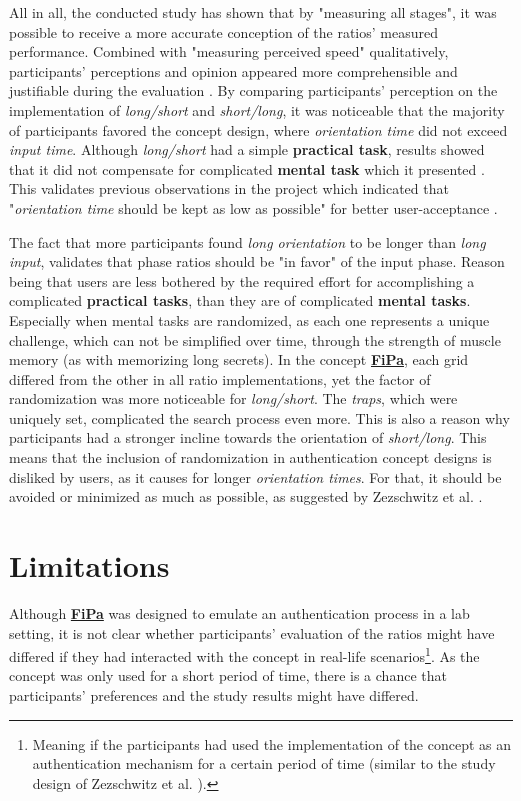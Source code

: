 All in all, the conducted study has shown that by "measuring all stages", it was possible to receive a more accurate conception of the ratios' measured performance. Combined with "measuring perceived speed" qualitatively, participants' perceptions and opinion appeared more comprehensible and justifiable during the evaluation \cite{Zezschwitz}. By comparing participants' perception on the implementation of \textit{long/short} and \textit{short/long}, it was noticeable that the majority of participants favored the concept design, where \textit{orientation time} did not exceed \textit{input time}. Although \textit{long/short} had a simple \textbf{practical task}, results showed that it did not compensate for complicated \textbf{mental task} which it presented \cite{Zezschwitz}. This validates previous observations in the project which indicated that "\textit{orientation time} should be kept as low as possible" for better user-acceptance \cite{Zezschwitz}.

The fact that more participants found \textit{long orientation} to be longer than \textit{long input}, validates that phase ratios should be "in favor" of the input phase. Reason being that users are less bothered by the required effort for accomplishing a complicated \textbf{practical tasks}, than they are of complicated \textbf{mental tasks}. Especially when mental tasks are randomized, as each one represents a unique challenge, which can not be simplified over time, through the strength of muscle memory (as with memorizing long secrets). In the concept \underline{\textbf{FiPa}}, each grid differed from the other in all ratio implementations, yet the factor of randomization was more noticeable for \textit{long/short}. The \textit{traps}, which were uniquely set, complicated the search process even more. This is also a reason why participants had a stronger incline towards the orientation of \textit{short/long}. This means that the inclusion of randomization in authentication concept designs is disliked by users, as it causes for longer \textit{orientation times}. For that, it should be avoided or minimized as much as possible, as suggested by Zezschwitz et al. \cite{Zezschwitz}.

\section{Limitations}

Although \underline{\textbf{FiPa}} was designed to emulate an authentication process in a lab setting, it is not clear whether participants' evaluation of the ratios might have differed if they had interacted with the concept in real-life scenarios\footnote{Meaning if the participants had used the implementation of the concept as an authentication mechanism for a certain period of time (similar to the study design of Zezschwitz et al. \cite{Zezschwitz}).}. As the concept was only used for a short period of time, there is a chance that participants' preferences and the study results might have differed.\\

